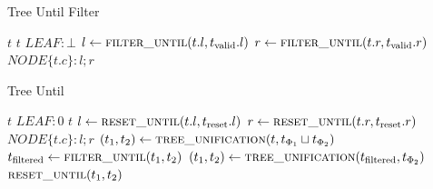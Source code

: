 \documentclass[11pt,a4paper,titlepage]{article}
\theoremstyle{definition}
\begin{document}
\begin{algorithm}[t]
    \caption{Tree Until Filter}         
    \label{alg:tree_until_filter}       
    \begin{algorithmic}
                \State \Return $t$
                \State \Return $t$
                \State \Return $LEAF: \bot$
            \Else
                \State $l \gets \Call{filter\_until}{t.l, t_{\text{valid}}.l}$
                \State $r \gets \Call{filter\_until}{t.r, t_{\text{valid}}.r}$
                \State \Return $NODE\{t.c \}: l ; r$
            \EndIf 
        \EndFunction
\end{algorithmic}
\end{algorithm}

\begin{algorithm}[t]                    
    \caption{Tree Until}         
    \label{alg:tree_until}       
    \begin{algorithmic}
                \State \Return $t$
                \State \Return $LEAF: 0$
                \State \Return $t$
            \Else
                \State $l \gets \Call{reset\_until}{t.l, t_{\text{reset}}.l}$
                \State $r \gets \Call{reset\_until}{t.r, t_{\text{reset}}.r}$
                \State \Return $NODE\{t.c \}: l ; r$
            \EndIf 
        \EndFunction
            \State $(t_1, t_2) \gets \Call{tree\_unification}{t, t_{\Phi_1} \sqcup t_{\Phi_2}}$
            \State $t_{\text{filtered}} \gets \Call{filter\_until}{t_1, t_2}$
            \State $(t_1, t_2) \gets \Call{tree\_unification}{t_{\text{filtered}}, t_{\Phi_2}}$
            \State \Return $\Call{reset\_until}{t_1, t_2}$
        \EndFunction
\end{algorithmic}
\end{algorithm}
\end{document}
